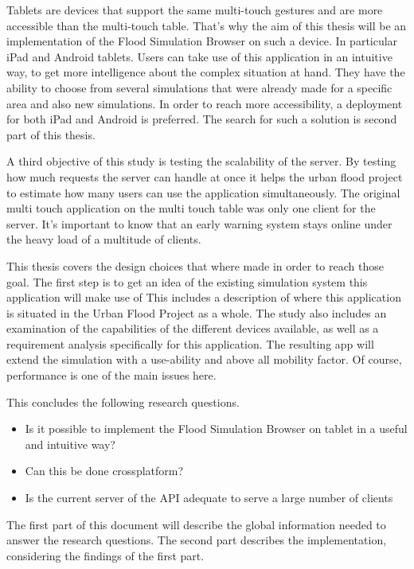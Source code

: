 Tablets are devices that support the same multi-touch gestures and are more accessible than the multi-touch table. That's why the aim of this thesis will be an implementation of the Flood Simulation Browser on such a device. In particular iPad\cite{ipad} and Android\cite{android} tablets. Users can take use of this application in an intuitive way, to get more intelligence about the complex situation at hand. They have the ability to choose from several simulations that were already made for a specific area and also new simulations. In order to reach more accessibility, a deployment for both iPad and Android is preferred. The search for such a solution is second part of this thesis.

A third objective of this study is testing the scalability of the server. By testing how much requests the server can handle at once it helps the urban flood project to estimate how many users can use the application simultaneously. The original multi touch application on the multi touch table was only one client for the server. It's important to know that an early warning system stays online under the heavy load of a multitude of clients.

This thesis covers the design choices that where made in order to reach those goal. 
The first step is to get an idea of the existing simulation system this application will make use of This includes a description of where this application is situated in the Urban Flood Project as a whole. The study also includes an examination of the capabilities of the different devices available, as well as a requirement analysis specifically for this application. The resulting app will extend the simulation with a use-ability and above all mobility factor. Of course, performance is one of the main issues here. 

This concludes the following research questions.

\begin{itemize}
\item Is it possible to implement the Flood Simulation Browser on tablet in a useful and intuitive way?
\item Can this be done crossplatform?
\item Is the current server of the API adequate to serve a large number of clients
\end{itemize}

The first part of this document will describe the global information needed to answer the research questions. The second part describes the implementation, considering the findings of the first part.

